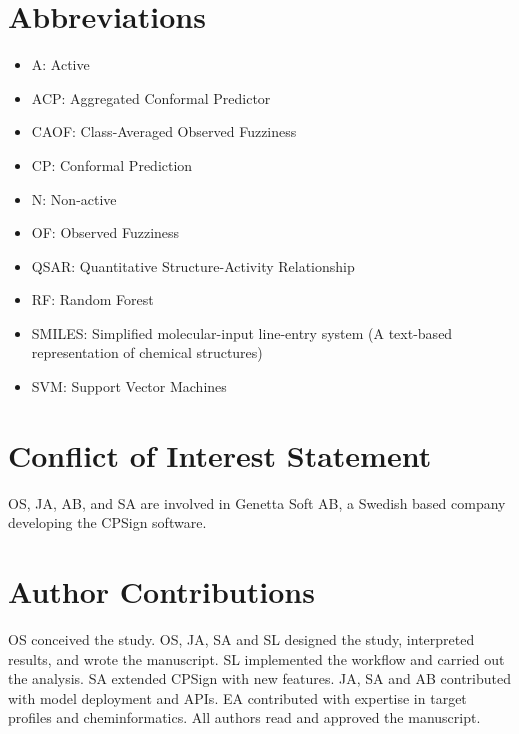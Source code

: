 \documentclass[utf8]{frontiersSCNS} %
\begin{document}
\section*{Abbreviations}

\begin{itemize}
    \item A: Active
    \item ACP: Aggregated Conformal Predictor
    \item CAOF: Class-Averaged Observed Fuzziness
    \item CP: Conformal Prediction
    \item N: Non-active
    \item OF: Observed Fuzziness
    \item QSAR: Quantitative Structure-Activity Relationship
    \item RF: Random Forest
    \item SMILES: Simplified molecular-input line-entry system (A text-based representation of chemical structures)
    \item SVM: Support Vector Machines
\end{itemize}

\section*{Conflict of Interest Statement}
OS, JA, AB, and SA are involved in Genetta Soft AB, a Swedish based company
developing the CPSign software.


\section*{Author Contributions}
OS conceived the study. OS, JA, SA and SL designed the study, interpreted
results, and wrote the manuscript. SL implemented the workflow and carried out
the analysis. SA extended CPSign with new features. JA, SA and AB contributed
with model deployment and APIs. EA contributed with expertise in target
profiles and cheminformatics. All authors read and approved the manuscript.


\end{document}
